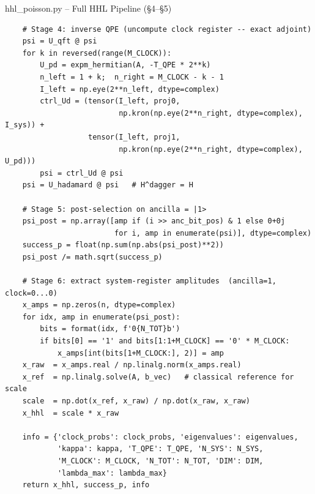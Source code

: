 \documentclass{beamer}
\begin{document}
\begin{frame}{hhl\_poisson.py -- Full HHL Pipeline (\S4--\S5)}
\begin{lstlisting}
    # Stage 4: inverse QPE (uncompute clock register -- exact adjoint)
    psi = U_qft @ psi
    for k in reversed(range(M_CLOCK)):
        U_pd = expm_hermitian(A, -T_QPE * 2**k)
        n_left = 1 + k;  n_right = M_CLOCK - k - 1
        I_left = np.eye(2**n_left, dtype=complex)
        ctrl_Ud = (tensor(I_left, proj0,
                          np.kron(np.eye(2**n_right, dtype=complex), I_sys)) +
                   tensor(I_left, proj1,
                          np.kron(np.eye(2**n_right, dtype=complex), U_pd)))
        psi = ctrl_Ud @ psi
    psi = U_hadamard @ psi   # H^dagger = H

    # Stage 5: post-selection on ancilla = |1>
    psi_post = np.array([amp if (i >> anc_bit_pos) & 1 else 0+0j
                         for i, amp in enumerate(psi)], dtype=complex)
    success_p = float(np.sum(np.abs(psi_post)**2))
    psi_post /= math.sqrt(success_p)

    # Stage 6: extract system-register amplitudes  (ancilla=1, clock=0...0)
    x_amps = np.zeros(n, dtype=complex)
    for idx, amp in enumerate(psi_post):
        bits = format(idx, f'0{N_TOT}b')
        if bits[0] == '1' and bits[1:1+M_CLOCK] == '0' * M_CLOCK:
            x_amps[int(bits[1+M_CLOCK:], 2)] = amp
    x_raw  = x_amps.real / np.linalg.norm(x_amps.real)
    x_ref  = np.linalg.solve(A, b_vec)   # classical reference for scale
    scale  = np.dot(x_ref, x_raw) / np.dot(x_raw, x_raw)
    x_hhl  = scale * x_raw

    info = {'clock_probs': clock_probs, 'eigenvalues': eigenvalues,
            'kappa': kappa, 'T_QPE': T_QPE, 'N_SYS': N_SYS,
            'M_CLOCK': M_CLOCK, 'N_TOT': N_TOT, 'DIM': DIM,
            'lambda_max': lambda_max}
    return x_hhl, success_p, info
\end{lstlisting}
\end{frame}

\end{document}
